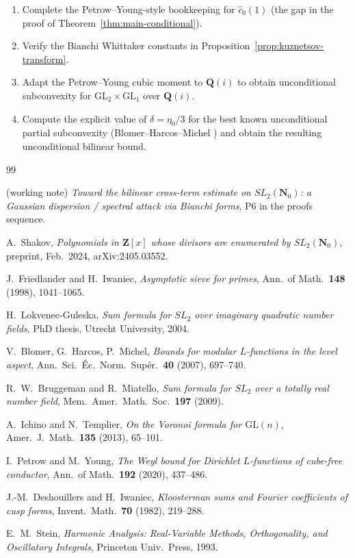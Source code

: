\documentclass[11pt]{article}
\theoremstyle{definition}
\newcommand{\Nz}{\mathbf{N}_0}
\newcommand{\Z}{\mathbf{Z}}
\newcommand{\Q}{\mathbf{Q}}
\newcommand{\SLNz}{SL_2(\Nz)}
\begin{document}
\begin{enumerate}
\item Complete the Petrow--Young-style bookkeeping for $\widehat c_0(1)$ (the gap in the proof of Theorem~\ref{thm:main-conditional}).
\item Verify the Bianchi Whittaker constants in Proposition~\ref{prop:kuznetsov-transform}.
\item Adapt the Petrow--Young cubic moment to $\Q(i)$ to obtain unconditional subconvexity for $\mathrm{GL}_2\times\mathrm{GL}_1$ over $\Q(i)$.
\item Compute the explicit value of $\delta=\eta_0/3$ for the best known unconditional partial subconvexity (Blomer--Harcos--Michel \cite{BHM}) and obtain the resulting unconditional bilinear bound.
\end{enumerate}

\begin{thebibliography}{99}

 (working note) \emph{Toward the bilinear cross-term estimate on $\SLNz$: a Gaussian dispersion / spectral attack via Bianchi forms}, P6 in the proofs sequence.

 A.~Shakov, \emph{Polynomials in $\Z[x]$ whose divisors are enumerated by $\SLNz$}, preprint, Feb.\ 2024, arXiv:2405.03552.

 J.~Friedlander and H.~Iwaniec, \emph{Asymptotic sieve for primes}, Ann.\ of Math.\ \textbf{148} (1998), 1041--1065.

 H.~Lokvenec-Guleska, \emph{Sum formula for $SL_2$ over imaginary quadratic number fields}, PhD thesis, Utrecht University, 2004.

 V.~Blomer, G.~Harcos, P.~Michel, \emph{Bounds for modular $L$-functions in the level aspect}, Ann.\ Sci.\ \'Ec.\ Norm.\ Sup\'er.\ \textbf{40} (2007), 697--740.

 R.~W.~Bruggeman and R.~Miatello, \emph{Sum formula for $SL_2$ over a totally real number field}, Mem.\ Amer.\ Math.\ Soc.\ \textbf{197} (2009).

 A.~Ichino and N.~Templier, \emph{On the Voronoi formula for $\mathrm{GL}(n)$}, Amer.\ J.\ Math.\ \textbf{135} (2013), 65--101.

 I.~Petrow and M.~Young, \emph{The Weyl bound for Dirichlet $L$-functions of cube-free conductor}, Ann.\ of Math.\ \textbf{192} (2020), 437--486.

 J.-M.~Deshouillers and H.~Iwaniec, \emph{Kloosterman sums and Fourier coefficients of cusp forms}, Invent.\ Math.\ \textbf{70} (1982), 219--288.

 E.~M.~Stein, \emph{Harmonic Analysis: Real-Variable Methods, Orthogonality, and Oscillatory Integrals}, Princeton Univ.\ Press, 1993.

\end{thebibliography}
\end{document}
